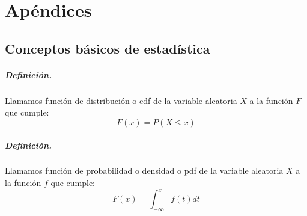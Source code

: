 
%
%
%
%
%
%
%
%

\chapter{Ap\'endices}
\label{sec:apendixes}


\section{Conceptos b\'asicos de estad\'istica}

\paragraph{Definici\'on.} Llamamos funci\'on de distribuci\'on o cdf de la
variable aleatoria $X$ a la funci\'on $F$ que cumple:
\begin{displaymath}
F(x) = P(X \leq x)
\end{displaymath}

\paragraph{Definici\'on.} Llamamos funci\'on de probabilidad o densidad o pdf
 de la variable aleatoria $X$ a la funci\'on $f$ que cumple:
\begin{displaymath}
F(x) = \int_{-\infty}^{x} f(t) dt
\end{displaymath}

